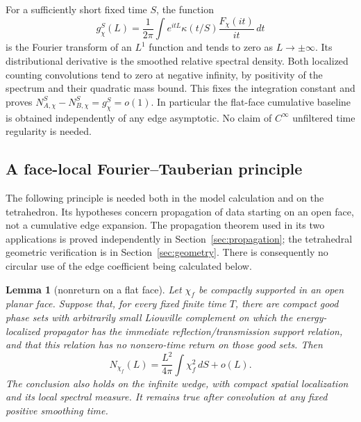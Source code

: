 \documentclass[11pt]{amsart}
\numberwithin{equation}{section}
\newtheorem{lemma}[theorem]{Lemma}
\theoremstyle{remark}
\begin{document}
For a sufficiently short fixed time $S$, the function
\begin{equation}\label{eq:gchi}
g^S_\chi(L)=\frac1{2\pi}\int e^{itL}\kappa(t/S)\frac{F_\chi(it)}{it}\,dt
\end{equation}
is the Fourier transform of an $L^1$ function and tends to zero as $L\to\pm\infty$. Its distributional derivative is the smoothed relative spectral density. Both localized counting convolutions tend to zero at negative infinity, by positivity of the spectrum and their quadratic mass bound. This fixes the integration constant and proves $N^S_{A,\chi}-N^S_{B,\chi}=g^S_\chi=o(1)$. In particular the flat-face cumulative baseline is obtained independently of any edge asymptotic. No claim of $C^\infty$ unfiltered time regularity is needed.

\subsection{A face-local Fourier--Tauberian principle}
The following principle is needed both in the model calculation and on the tetrahedron. Its hypotheses concern propagation of data starting on an open face, not a cumulative edge expansion. The propagation theorem used in its two applications is proved independently in Section~\ref{sec:propagation}; the tetrahedral geometric verification is in Section~\ref{sec:geometry}. There is consequently no circular use of the edge coefficient being calculated below.

\begin{lemma}[nonreturn on a flat face]\label{lem:nonreturn}
Let $\chi_f$ be compactly supported in an open planar face. Suppose that, for every fixed finite time $T$, there are compact good phase sets with arbitrarily small Liouville complement on which the energy-localized propagator has the immediate reflection/transmission support relation, and that this relation has no nonzero-time return on those good sets. Then
\begin{equation}\label{eq:facelaw}
N_{\chi_f}(L)=\frac{L^2}{4\pi}\int\chi_f^2\,dS+o(L) .
\end{equation}
The conclusion also holds on the infinite wedge, with compact spatial localization and its local spectral measure. It remains true after convolution at any fixed positive smoothing time.
\end{lemma}
\end{document}
